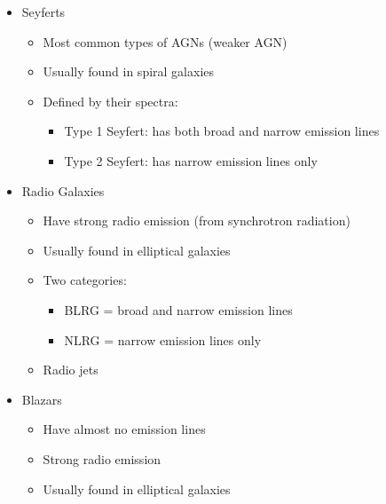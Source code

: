 \documentclass{book}
\begin{document}
\begin{itemize}
\begin{itemize}
              \item Seyferts
                    \begin{itemize}
                        \item Most common types of AGNs (weaker AGN)
                        \item Usually found in spiral galaxies
                        \item Defined by their spectra:
                              \begin{itemize}
                                  \item Type 1 Seyfert: has both broad and narrow emission lines
                                  \item Type 2 Seyfert: has narrow emission lines only
                              \end{itemize}
                    \end{itemize}
              \item Radio Galaxies
                    \begin{itemize}
                        \item Have strong radio emission (from synchrotron radiation)
                        \item Usually found in elliptical galaxies
                        \item Two categories:
                              \begin{itemize}
                                  \item BLRG = broad and narrow emission lines
                                  \item NLRG = narrow emission lines only
                              \end{itemize}
                        \item Radio jets
                    \end{itemize}
              \item Blazars
                    \begin{itemize}
                        \item Have almost no emission lines
                        \item Strong radio emission
                        \item Usually found in elliptical galaxies
                    \end{itemize}
          \end{itemize}
          \begin{center}

\end{center}
\end{itemize}
\end{document}
